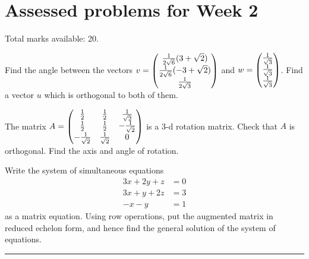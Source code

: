 \documentclass{article}
\begin{document}
\section{Assessed problems for Week 2}


Total marks available: 20.


\begin{Question}
Find the angle between the vectors \(v=\begin{pmatrix}
\frac{1}{2\sqrt{6}}(3+\sqrt{2}) \\ \frac{1}{2\sqrt{6}}(-3+\sqrt{2})
\\ \frac{1}{2\sqrt{3}} \end{pmatrix}\) and \(w=\begin{pmatrix} \frac{1}{\sqrt{3}}
\\ \frac{1}{\sqrt{3}} \\ \frac{1}{\sqrt{3}}\end{pmatrix}\). Find a vector
\(u\) which is orthogonal to both of them. 


\end{Question}
\begin{Question}
The matrix \(A=\begin{pmatrix} \frac{1}{2} & \frac{1}{2} & \frac{1}{\sqrt{2}}
\\ \frac{1}{2} & \frac{1}{2} & -\frac{1}{\sqrt{2}}
\\ -\frac{1}{\sqrt{2}} & \frac{1}{\sqrt{2}} & 0\end{pmatrix}\) is a 3-d
rotation matrix. Check that \(A\) is orthogonal. Find the axis and
angle of rotation. 


\end{Question}
\begin{Question}
Write the system of simultaneous equations
\begin{align*}3x+2y+z&=0\\ 3x+y+2z&=3\\ -x-y&=1\end{align*}
as a matrix equation. Using row operations, put the augmented matrix
 in reduced echelon form, and hence find the general solution
of the system of equations.


\end{Question}
\rule{\textwidth}{0.4pt}


\end{document}
